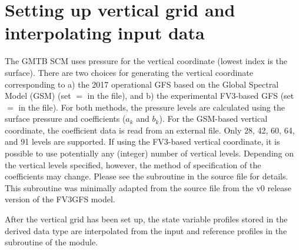 \section{Setting up vertical grid and interpolating input data}
The GMTB SCM uses pressure for the vertical coordinate (lowest index is the surface). There are two choices for generating the vertical coordinate corresponding to a) the 2017 operational GFS based on the Global Spectral Model (GSM) (set  $=$  in the  file), and b) the experimental FV3-based GFS (set  $=$  in the  file). For both methods, the pressure levels are calculated using the surface pressure and coefficients ($a_k$ and $b_k$). For the GSM-based vertical coordinate, the coefficient data is read from an external file. Only 28, 42, 60, 64, and 91 levels are supported. If using the FV3-based vertical coordinate, it is possible to use potentially any (integer) number of vertical levels. Depending on the vertical levels specified, however, the method of specification of the coefficients may change. Please see the subroutine  in the source file  for details. This subroutine was minimally adapted from the source file  from the v0 release version of the FV3GFS model.

After the vertical grid has been set up, the state variable profiles stored in the  derived data type are interpolated from the input and reference profiles in the  subroutine of the  module.

